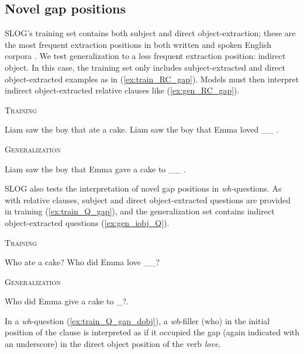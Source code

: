 \subsection{Novel gap positions} \label{subsec:cat_gap}
SLOG's training set contains both subject and direct object-extraction; these are the most frequent extraction positions in both written and spoken English corpora \citep{roland2007frequency,ATKINSON2018132}. We test generalization to a less frequent extraction position: indirect object. In this case, the training set only includes subject-extracted and direct object-extracted examples as in (\ref{ex:train_RC_gap}). Models must then interpret indirect object-extracted relative clauses like (\ref{ex:gen_RC_gap}). 
\vspace{-0.5\baselineskip}
\begin{exe}
    \ex \label{ex:train_RC_gap} \textsc{Training}
        \begin{xlist}
          \ex Liam saw the boy that ate a cake. 
          \ex Liam saw the boy that Emma loved \_\_ .
        \end{xlist} 
    \ex \label{ex:gen_RC_gap} \textsc{Generalization} 
        \begin{xlist}
            \ex Liam saw the boy that Emma gave a cake to \_\_ .
        \end{xlist}
\end{exe}
\vspace{-0.5\baselineskip}
SLOG also tests the interpretation of novel gap positions in \textit{wh-}questions. As with relative clauses, subject and direct object-extracted questions are provided in training (\ref{ex:train_Q_gap}), and the generalization set contains indirect object-extracted questions (\ref{ex:gen_iobj_Q}). 
\vspace{-0.5\baselineskip}
\begin{exe}
    \ex \label{ex:train_Q_gap}\textsc{Training}
        \begin{xlist}
          \ex  Who ate a cake? 
          \ex  \label{ex:train_Q_gap_dobj} Who did Emma love \_\_?
        \end{xlist} 
    \ex \label{ex:gen_iobj_Q} \textsc{Generalization} 
        \begin{xlist}
            \ex Who did Emma give a cake to \_?.
        \end{xlist}
\end{exe}
\vspace{-0.5\baselineskip}
\noindent In a \textit{wh}-question (\ref{ex:train_Q_gap_dobj}), a \textit{wh}-filler (who) in the initial position of the clause is interpreted as if it occupied the gap (again indicated with an underscore) in the direct object position of the verb \textit{love}.


